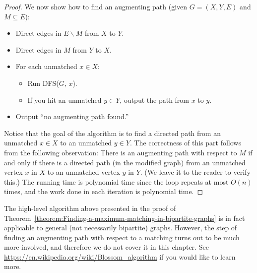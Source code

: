 \begin{flex}
\begin{proof}
We now show how to find an augmenting path (given $G = (X,Y,E)$ and $M \subseteq E$):
\begin{itemize}
    \item Direct edges in $E \backslash M$ from $X$ to $Y$.
    \item Direct edges in $M$ from $Y$ to $X$. 
    \item For each unmatched $x \in X$:
    \begin{itemize}
        \item Run DFS($G$, $x$).
        \item If you hit an unmatched $y \in Y$, output the path from $x$ to $y$.
    \end{itemize}
    \item Output ``no augmenting path found.''
\end{itemize}
Notice that the goal of the algorithm is to find a directed path from an unmatched $x \in X$ to an unmatched $y \in Y$. The correctness of this part follows from the following observation: There is an augmenting path with respect to $M$ if and only if there is a directed path (in the modified graph) from an unmatched vertex $x$ in $X$ to an unmatched vertex $y$ in $Y$. (We leave it to the reader to verify this.) The running time is polynomial time since the loop repeats at most $O(n)$ times, and the work done in each iteration is polynomial time.
\end{proof}
\end{flex}


\begin{note} \label{note:Finding-a-maximum-matching-in-non-bipartite-graphs}
The high-level algorithm above presented in the proof of Theorem~\ref{theorem:Finding-a-maximum-matching-in-bipartite-graphs} is in fact applicable to general (not necessarily bipartite) graphs. However, the step of finding an augmenting path with respect to a matching turns out to be much more involved, and therefore we do not cover it in this chapter. See \url{https://en.wikipedia.org/wiki/Blossom_algorithm} if you would like to learn more.
\end{note}


